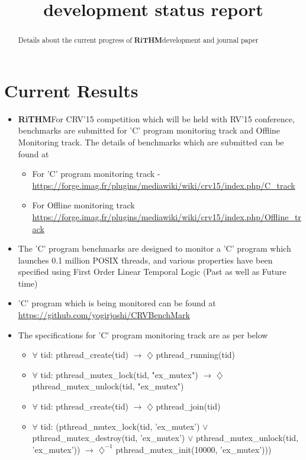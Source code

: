 \documentclass[]{article}
\title{\rithm development status report}
\author{}
\newcommand{\rithm}{\textbf{RiTHM}\space}
\begin{document}
\maketitle

\begin{abstract}
Details about the current progress of \rithm development and journal paper
\end{abstract}
\section{Current Results}
\begin{itemize}
	\item \rithm For CRV'15 competition which will be held with RV'15 conference, benchmarks are submitted for 'C' program monitoring track and Offline Monitoring track.
	The details of benchmarks which are submitted can be found at 
	\begin{itemize}
		\item For 'C' program monitoring track - \url{https://forge.imag.fr/plugins/mediawiki/wiki/crv15/index.php/C_track}
		\item For Offline monitoring track \url{https://forge.imag.fr/plugins/mediawiki/wiki/crv15/index.php/Offline_track}
	\end{itemize}
	\item The 'C' program benchmarks are designed to monitor a 'C' program which launches 0.1 million POSIX threads, and various properties have been specified using First Order Linear Temporal Logic (Past as well as Future time)
	\item 'C' program which is being monitored can be found at \url{https://github.com/yogirjoshi/CRVBenchMark}
	\item The specifications for 'C' program monitoring track are as per below
	\begin{itemize}
		\item $\forall$ tid: pthread\_create(tid) $\longrightarrow$ $\diamondsuit$ pthread\_running(tid)
		\item $\forall$ tid: pthread\_mutex\_lock(tid, "ex\_mutex") $\longrightarrow$ $\diamondsuit$ pthread\_mutex\_unlock(tid, "ex\_mutex")
		\item $\forall$ tid: pthread\_create(tid) $\longrightarrow$ $\diamondsuit$ pthread\_join(tid)
		\item $\forall$ tid: (pthread\_mutex\_lock(tid, 'ex\_mutex') $\vee$ pthread\_mutex\_destroy(tid, 'ex\_mutex') $\vee$ pthread\_mutex\_unlock(tid, 'ex\_mutex')) $\longrightarrow$ $\diamondsuit^{-1}$ pthread\_mutex\_init(10000, 'ex\_mutex')))

\end{itemize}
\end{itemize}
\end{document}
